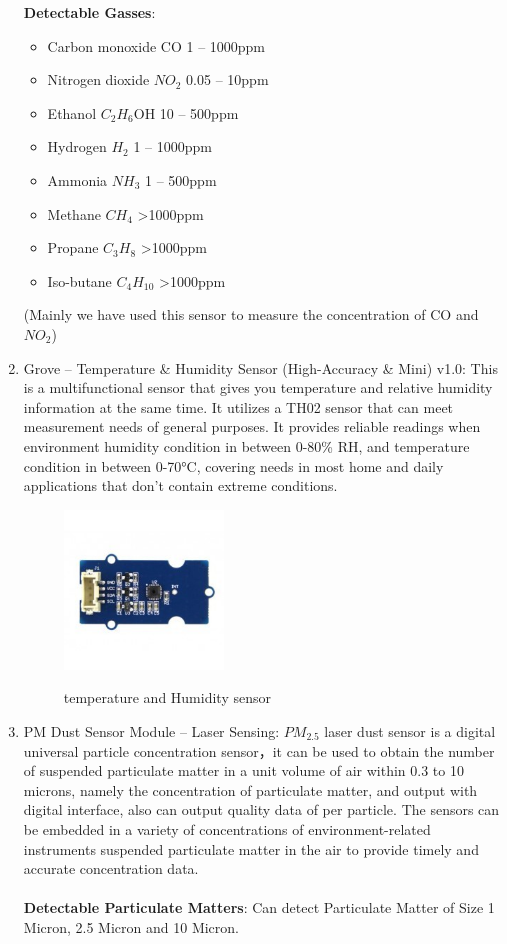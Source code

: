 \begin{enumerate}
	\textbf{Detectable Gasses}:
		\begin{itemize}
			\item Carbon monoxide CO 1 – 1000ppm
			\item Nitrogen dioxide $NO_2$ 0.05 – 10ppm
			\item Ethanol $C_2H_6$OH 10 – 500ppm
			\item Hydrogen $H_2$ 1 – 1000ppm
			\item Ammonia $NH_3$ 1 – 500ppm
			\item Methane $CH_4$ >1000ppm
			\item Propane $C_3H_8$ >1000ppm
			\item Iso-butane $C_4H_{10}$ >1000ppm
		\end{itemize}
	(Mainly we have used this sensor to measure the concentration of CO and $NO_2$)
	\item Grove – Temperature \& Humidity Sensor (High-Accuracy \& Mini) v1.0: This is a multifunctional sensor that gives you temperature and relative humidity information at the same time. It utilizes a TH02 sensor that can meet measurement needs of general purposes. It provides reliable readings when environment humidity condition in between 0-80\% RH, and temperature condition in between 0-70°C, covering needs in most home and daily applications that don’t contain extreme conditions.
	\\
	\begin{figure}[h]
	\centering
	\includegraphics[width=0.4\textwidth]{./temp}\\[0.1in]
	\label{fig:temperature and Humidity sensor}
	\caption{temperature and Humidity sensor}
	\end{figure}
	
	\item PM Dust Sensor Module – Laser Sensing: $PM_{2.5}$ laser dust sensor is a digital universal particle concentration sensor，it can be used to obtain the number of suspended particulate matter in a unit volume of air within 0.3 to 10 microns, namely the concentration of particulate matter, and output with digital interface, also can output quality data of per particle. The sensors can be embedded in a variety of concentrations of environment-related instruments suspended particulate matter in the air to provide timely and accurate concentration data.
\\
\\
	\textbf{Detectable Particulate Matters}: Can detect Particulate Matter of Size 1 Micron, 2.5 Micron and 10 Micron.
\end{enumerate}

